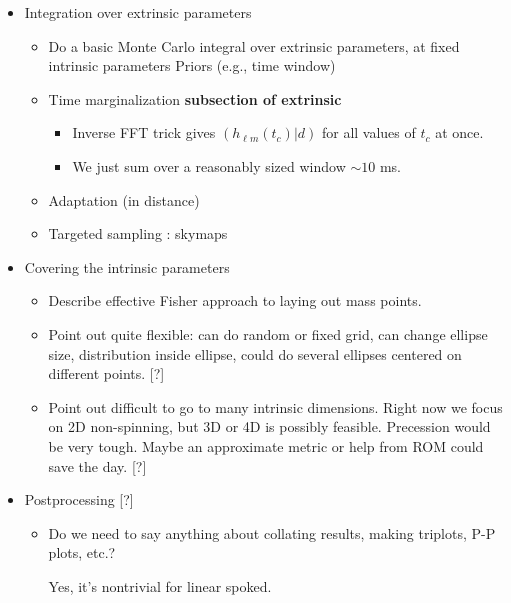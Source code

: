 \documentclass[twocolumn,prd,nofootinbib]{revtex4}
\begin{document}
{\begin{widetext}
\begin{itemize}
\begin{itemize}
		
	\item Integration over extrinsic parameters
		\begin{itemize}
		\item Do a basic Monte Carlo integral over  extrinsic parameters, at fixed intrinsic parameters
                        Priors (e.g., time window)
		\end{itemize}
                \begin{itemize}
  	         \item Time marginalization  \textbf{subsection of extrinsic} 
		  \begin{itemize}
		  \item Inverse FFT trick gives $(h_{\ell m}(t_c) | d)$ for all values of $t_c$ at once.
		  \item We just sum over a reasonably sized window $\sim 10$ ms. 
		  \end{itemize}
                 \item Adaptation (in distance)
                 \item Targeted sampling : skymaps
                \end{itemize}

	\item Covering the intrinsic parameters
		\begin{itemize}
		\item Describe effective Fisher approach to laying out mass points.
		\item Point out quite flexible: can do random or fixed grid, can change ellipse size, distribution inside ellipse,
			could do several ellipses centered on different points. [?]
		\item Point out difficult to go to many intrinsic dimensions. Right now we focus on 2D non-spinning, 
			but 3D or 4D is possibly feasible.
			Precession would be very tough. 
			Maybe an approximate metric or help from ROM could save the day. [?]
		\end{itemize}
		
	
	\item Postprocessing [?]
		\begin{itemize}
		\item Do we need to say anything about collating results, making triplots, P-P plots, etc.?

                  Yes, it's nontrivial for linear spoked.
		\end{itemize}


\end{itemize}
\end{itemize}
\end{widetext}}
\end{document}
